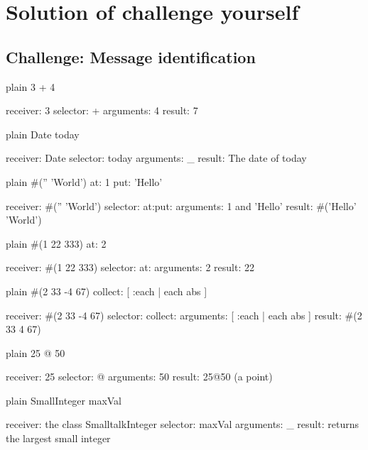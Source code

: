 \documentclass[10pt,twoside,english]{_support/latex/sbabook/sbabook}
\begin{document}
\frontmatter
\pagestyle{plain}

\tableofcontents*
\clearpage\listoffigures

\mainmatter

\chapter{Solution of challenge yourself}\section{Challenge: Message identification}
\begin{displaycode}{plain}
3 + 4

	receiver: 3
	selector: +
	arguments: 4
	result: 7
\end{displaycode}

\begin{displaycode}{plain}
Date today

	receiver: Date
	selector: today 
	arguments: _
	result: The date of today
\end{displaycode}

\begin{displaycode}{plain}
#('' 'World') at: 1 put: 'Hello'

	receiver: #('' 'World')
	selector: at:put:
	arguments: 1 and 'Hello'
	result: #('Hello' 'World')
\end{displaycode}

\begin{displaycode}{plain}
#(1 22 333) at: 2

	receiver: #(1 22 333)
	selector:	at:
	arguments: 2
	result: 22
\end{displaycode}

\begin{displaycode}{plain}
#(2 33 -4 67) collect: [ :each | each abs ]

	receiver: #(2 33 -4 67)
	selector: collect: 
	arguments: [ :each | each abs ]
	result: #(2 33 4 67)
\end{displaycode}

\begin{displaycode}{plain}
25 @ 50

	receiver: 25
	selector: @
	arguments: 50
	result: 25@50 (a point)
\end{displaycode}

\begin{displaycode}{plain}
SmallInteger maxVal


	receiver: the class SmalltalkInteger
	selector: maxVal
	arguments: _ 
	result: returns the largest small integer
\end{displaycode}
\end{document}
